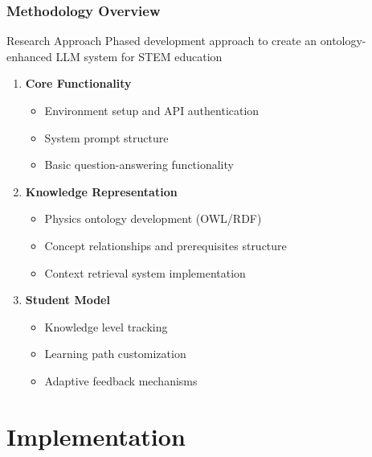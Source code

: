 \documentclass{beamer}
\begin{document}
\begin{frame}
\frametitle{Methodology Overview}

\begin{block}{Research Approach}
Phased development approach to create an ontology-enhanced LLM system for STEM education
\end{block}

\begin{enumerate}
    \item \textbf{Core Functionality} \cite{pallets2024quart}
    \begin{itemize}
        \item Environment setup and API authentication
        \item System prompt structure
        \item Basic question-answering functionality
    \end{itemize}
    
    \item \textbf{Knowledge Representation} \cite{horrocks2024owl, scibite2024ontologies}
    \begin{itemize}
        \item Physics ontology development (OWL/RDF)
        \item Concept relationships and prerequisites structure
        \item Context retrieval system implementation
    \end{itemize}
    
    \item \textbf{Student Model} \cite{rodriguez2024adaptive}
    \begin{itemize}
        \item Knowledge level tracking
        \item Learning path customization
        \item Adaptive feedback mechanisms
    \end{itemize}
\end{enumerate}
\end{frame}

\section{Implementation}
\end{document}
